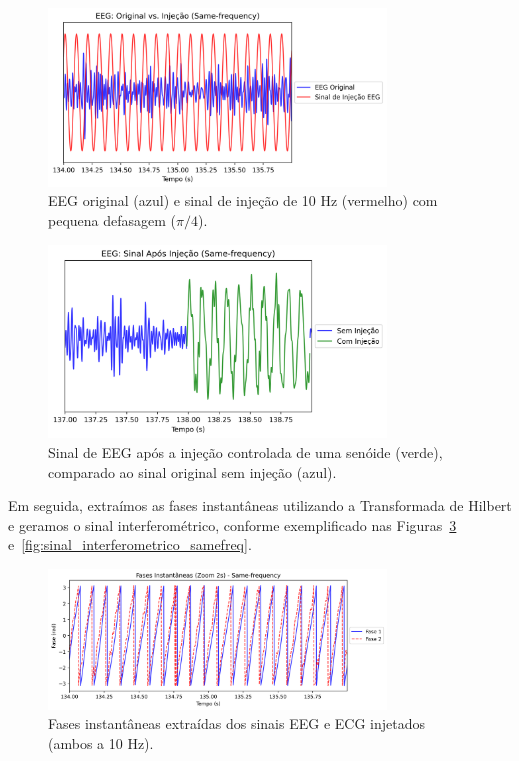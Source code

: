 \begin{figure}[htb]
    \centering
    \includegraphics[width=0.8\textwidth]{figs/3_2_testing_connectivity_metrics/10_EEG_Original_vs_Injecao_Same-frequency.png}
    \caption{EEG original (azul) e sinal de injeção de 10 Hz (vermelho) com pequena defasagem (\(\pi/4\)).}
    \label{fig:eeg_original_vs_injection_samefreq}
\end{figure}

\begin{figure}[htb]
    \centering
    \includegraphics[width=0.8\textwidth]{figs/3_2_testing_connectivity_metrics/11_EEG_Injetado_Same-frequency.png}
    \caption{Sinal de EEG após a injeção controlada de uma senóide (verde), comparado ao sinal original sem injeção (azul).}
    \label{fig:eeg_injected_samefreq}
\end{figure}

Em seguida, extraímos as fases instantâneas utilizando a Transformada de Hilbert e geramos o sinal interferométrico, conforme exemplificado nas Figuras~\ref{fig:fases_instantaneas_samefreq} e~\ref{fig:sinal_interferometrico_samefreq}.

\begin{figure}[htb]
    \centering
    \includegraphics[width=0.8\textwidth]{figs/3_2_testing_connectivity_metrics/12_Passo1_Fases_Same-frequency.png}
    \caption{Fases instantâneas extraídas dos sinais EEG e ECG injetados (ambos a 10 Hz).}
    \label{fig:fases_instantaneas_samefreq}
\end{figure}

